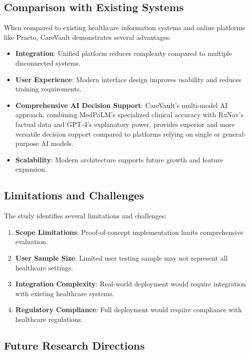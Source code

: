 \documentclass[12pt,a4paper]{article}
\begin{document}
\subsection{Comparison with Existing Systems}

When compared to existing healthcare information systems and online platforms like Practo, CareVault demonstrates several advantages:

\begin{itemize}
    \item \textbf{Integration}: Unified platform reduces complexity compared to multiple disconnected systems.
    \item \textbf{User Experience}: Modern interface design improves usability and reduces training requirements.
    \item \textbf{Comprehensive AI Decision Support}: CareVault's multi-model AI approach, combining MedPaLM's specialized clinical accuracy with RxNav's factual data and GPT-4's explanatory power, provides superior and more versatile decision support compared to platforms relying on single or general-purpose AI models.
    \item \textbf{Scalability}: Modern architecture supports future growth and feature expansion.
\end{itemize}

\subsection{Limitations and Challenges}

The study identifies several limitations and challenges:

\begin{enumerate}
    \item \textbf{Scope Limitations}: Proof-of-concept implementation limits comprehensive evaluation.
    \item \textbf{User Sample Size}: Limited user testing sample may not represent all healthcare settings.
    \item \textbf{Integration Complexity}: Real-world deployment would require integration with existing healthcare systems.
    \item \textbf{Regulatory Compliance}: Full deployment would require compliance with healthcare regulations.
\end{enumerate}

\subsection{Future Research Directions}
\end{document}
